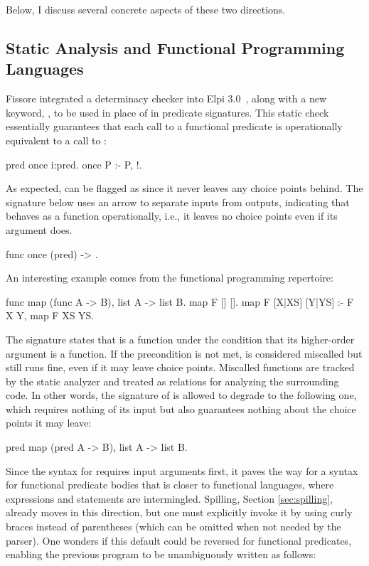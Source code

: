 \documentclass{these-ISSS}
\newenvironment{elpicode}
  {\VerbatimEnvironment\begin{elpibox}\begin{xelpicode}}{\end{xelpicode}
\end{elpibox}}
\begin{document}
Below, I discuss several concrete aspects of these two directions.

\subsection{Static Analysis and Functional Programming Languages}

Fissore integrated a determinacy checker into Elpi 3.0~\cite{elpidet}, along
with a new keyword, , to be used in place of  in
predicate signatures. This static check essentially guarantees that each call
to a functional predicate  is operationally equivalent to a call to
:

\begin{elpicode}
pred once i:pred.
once P :- P, !.
\end{elpicode}

\noindent As expected,  can be flagged as  since it
never leaves any choice points behind. The signature below uses an arrow to
separate inputs from outputs, indicating that  behaves as a
function operationally, i.e., it leaves no choice points even if its argument
does.

\begin{elpicode}
func once (pred) -> .
\end{elpicode}

\noindent An interesting example comes from the functional programming
repertoire:
\begin{elpicode}
func map (func A -> B), list A -> list B.
map F [] [].
map F [X|XS] [Y|YS] :- F X Y, map F XS YS.
\end{elpicode}

\noindent The signature states that  is a function under the
condition that its higher-order argument  is a function. If the
precondition is not met,  is considered miscalled but still runs
fine, even if it may leave choice points. Miscalled functions are tracked by
the static analyzer and treated as relations for analyzing the surrounding
code. In other words, the signature of  is allowed to degrade to the
following one, which requires nothing of its input but also guarantees nothing
about the choice points it may leave:
\begin{elpicode}
pred map (pred A -> B), list A -> list B.
\end{elpicode}

Since the syntax for  requires input arguments first, it paves the
way for a syntax for functional predicate bodies that is closer to functional
languages, where expressions and statements are intermingled. Spilling,
Section \ref{sec:spilling}, already moves in this direction, but one must
explicitly invoke it by using curly braces instead of parentheses (which can
be omitted when not needed by the parser). One wonders if this default could
be reversed for functional predicates, enabling the previous program to be
unambiguously written as follows:
\end{document}
